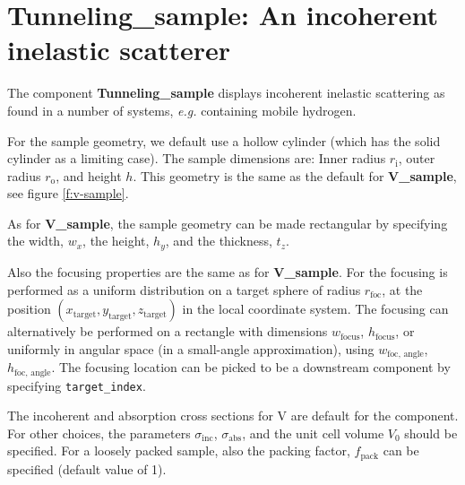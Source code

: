\section{Tunneling\_sample: An incoherent inelastic scatterer}
\label{s:Tunneling_sample}



The component \textbf{Tunneling\_sample}
displays incoherent inelastic scattering as found in a number of systems, {\em e.g.}
containing mobile hydrogen. 

For the sample geometry, we default use a
hollow cylinder (which has the solid cylinder as a limiting case).
The sample dimensions are: Inner radius $r_\textrm{i}$,
outer radius $r_\textrm{o}$, and height $h$. This geometry is the same as 
the default for \textbf{V\_sample}, see figure \ref{f:v-sample}.

As for \textbf{V\_sample}, the sample geometry can be made rectangular 
by specifying the width, $w_x$, the height, $h_y$, and the thickness, $t_z$.

Also the focusing properties are the same as for \textbf{V\_sample}.
For the focusing is performed as a uniform distribution on
a target sphere of radius $r_\textrm{foc}$, at the position
$(x_\textrm{target},y_\textrm{target},z_\textrm{target})$
in the local coordinate system.
The focusing can alternatively be performed on a rectangle with dimensions
$w_\textrm{focus}$, $h_\textrm{focus}$, or uniformly in angular space
(in a small-angle approximation),
using $w_\textrm{foc, angle}$, $h_\textrm{foc, angle}$.
The focusing location can be picked to be a downstream component by
specifying \verb+target_index+.

The incoherent and absorption cross sections for V are default
for the component. For other choices, the
parameters $\sigma_\textrm{inc}$, $\sigma_\textrm{abs}$,
and the unit cell volume $V_0$ should be specified.
For a loosely packed sample, also the packing factor, $f_\textrm{pack}$
can be specified (default value of 1).

